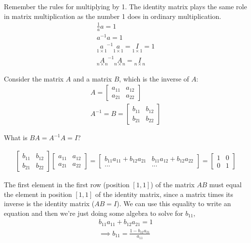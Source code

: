 \documentclass[12pt]{article}
\begin{document}
Remember the rules for multiplying by 1. The identity matrix plays the same role in matrix multiplication as the number 1 does in ordinary multiplication.
\begin{align}
    \frac{1}{a} a = 1\\
    a^{-1}a = 1 \\
    \underset{1 \times 1}a^{-1} \underset{1 \times 1}a = \underset{1 \times 1}I = 1\\
    \underset{n \times n}A^{-1} \underset{n \times n}A = \underset{n \times n}I
\end{align}

Consider the matrix $A$ and a matrix $B$, which is the inverse of $A$:
\begin{align}
    A = \begin{bmatrix}
        a_{11} & a_{12} \\
        a_{21} & a_{22}
    \end{bmatrix}\\
    A^{-1} = B = \begin{bmatrix}
        b_{11} & b_{12} \\
        b_{21} & b_{22}
    \end{bmatrix}
\end{align}

What is $BA = A^{-1}A = I$?

\begin{align}
    \begin{bmatrix}
        b_{11} & b_{12} \\
        b_{21} & b_{22}
    \end{bmatrix}
    \begin{bmatrix}
        a_{11} & a_{12} \\
        a_{21} & a_{22}
    \end{bmatrix}
    =     \begin{bmatrix}
        b_{11}a_{11} + b_{12}a_{21} & b_{11}a_{12} + b_{12}a_{22} \\
        ... & ...
    \end{bmatrix} = 
    \begin{bmatrix}
        1 & 0 \\
        0 & 1
    \end{bmatrix}
\end{align}

The first element in the first row (position $[1,1]$) of the matrix $AB$ must equal the element in position $[1,1]$ of the identity matrix, since a matrix times its inverse is the identity matrix ($AB=I$). We can use this equality to write an equation and then we're just doing some algebra to solve for $b_{11}$,
\begin{align}
    b_{11}a_{11} + b_{12}a_{21} = 1\\
    \implies b_{11} = \frac{1 - b_{12} a_{21}}{a_{11}} \label{b_11}
\end{align}
\end{document}
